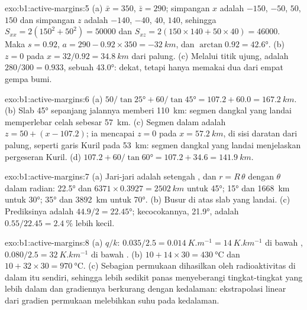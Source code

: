 \begin{solution}{exo:b1:active-margins:5}
(a) $\bar x = 350$, $\bar z = 290$; simpangan $x$ adalah $-150$, $-50$,
$50$, $150$ dan simpangan $z$ adalah $-140$, $-40$, $40$, $140$, sehingga
$S_{xx} = 2(150^2 + 50^2) = \num{50000}$ dan
$S_{xz} = 2(150\times140 + 50\times40) = \num{46000}$. Maka $s = 0.92$,
$a = 290 - 0.92\times350 = \qty{-32}{km}$, dan 
$\arctan 0.92 = \ang{42.6}$. (b) $z = 0$ pada $x = 32/0.92 = \qty{34.8}{km}$
dari palung. (c) Melalui titik ujung,  adalah $280/300 = 0.933$, sebuah
 \ang{43.0}: dekat, tetapi hanya memakai dua dari empat gempa bumi.
\end{solution}

\begin{solution}{exo:b1:active-margins:6}
(a) $50/\tan\ang{25} + 60/\tan\ang{45} = 107.2 + 60.0 = \qty{167.2}{km}$.
(b) Slab \ang{45} sepanjang jalannya memberi \qty{110}{km}: segmen dangkal yang landai
memperlebar celah sebesar \qty{57}{km}. (c) Segmen dalam adalah
$z = 50 + (x - 107.2)$; ia mencapai $z = 0$ pada $x = \qty{57.2}{km}$, di sisi daratan
dari palung, seperti garis Kuril pada \qty{53}{km}: segmen dangkal yang landai
menjelaskan pergeseran Kuril. (d) $107.2 + 60/\tan\ang{60} = 107.2 + 34.6 =
\qty{141.9}{km}$.
\end{solution}

\begin{solution}{exo:b1:active-margins:7}
(a) Jari-jari adalah setengah , dan $r = R\,\theta$ dengan $\theta$ dalam radian:
\ang{22.5} dan $6371\times0.3927 = \qty{2502}{km}$ untuk \ang{45}; \ang{15} dan
\qty{1668}{km} untuk \ang{30}; \ang{35} dan \qty{3892}{km} untuk \ang{70}.
(b) Busur di atas slab yang landai. (c) Prediksinya adalah
$44.9/2 = \ang{22.45}$; kecocokannya, \ang{21.9}, adalah
$0.55/22.45 = \qty{2.4}{\percent}$ lebih kecil.
\end{solution}

\begin{solution}{exo:b1:active-margins:8}
(a) $q/k$: $0.035/2.5 = \qty{0.014}{K.m^{-1}} = \qty{14}{K.km^{-1}}$ di bawah
, $0.080/2.5 = \qty{32}{K.km^{-1}}$ di bawah .
(b) $10 + 14\times30 = \qty{430}{\celsius}$ dan
$10 + 32\times30 = \qty{970}{\celsius}$. (c) Sebagian  permukaan dihasilkan
oleh radioaktivitas di dalam  itu sendiri, sehingga lebih sedikit panas menyeberangi
tingkat-tingkat yang lebih dalam dan gradiennya berkurang dengan kedalaman: ekstrapolasi
linear dari gradien permukaan melebihkan suhu pada kedalaman.
\end{solution}

